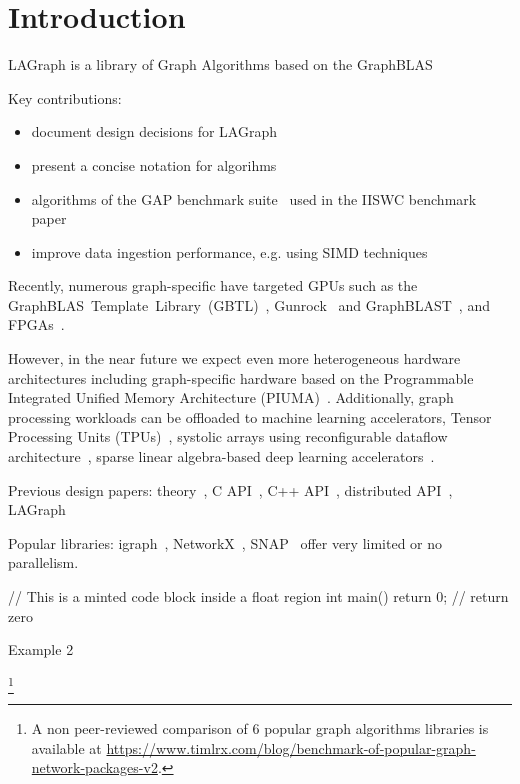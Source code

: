 \section{Introduction}
\label{sec:introduction}

LAGraph is a library of Graph Algorithms based on the GraphBLAS

Key contributions:

\begin{itemize}
    \item document design decisions for LAGraph
    \item present a concise notation for \grb algorihms
    \item algorithms of the GAP benchmark suite~\cite{DBLP:journals/corr/BeamerAP15} used in the IISWC benchmark paper~\cite{DBLP:conf/iiswc/AzadABBCDDDDFGG20}
    \item improve data ingestion performance, e.g. using SIMD techniques~\cite{DBLP:journals/vldb/LangdaleL19}
\end{itemize}

Recently, numerous graph-specific have targeted GPUs such as the \mbox{GraphBLAS Template Library (GBTL)}~\cite{7529957}, Gunrock~\cite{DBLP:journals/topc/WangPDWYWOYLRO17} and \mbox{GraphBLAST}~\cite{DBLP:journals/corr/abs-1908-01407}, and FPGAs~\cite{DBLP:journals/corr/abs-1903-06697}.

However, in the near future we expect even more heterogeneous hardware architectures including graph-specific hardware based on the Programmable Integrated Unified Memory Architecture (PIUMA)~\cite{DBLP:journals/corr/abs-2010-06277}.
Additionally, graph processing workloads can be offloaded to  machine learning accelerators, \eg
Tensor Processing Units (TPUs)~\cite{DBLP:conf/isca/JouppiYPPABBBBB17},
systolic arrays using reconfigurable dataflow architecture~\cite{SambaNova},
sparse linear algebra-based deep learning accelerators~\cite{Cerebras}.

Previous \grb design papers:
theory~\cite{DBLP:conf/hpec/MattsonBBBDFFGGHKLLPPRSWY13},
C API~\cite{DBLP:conf/hpec/MattsonYMBM17},
C++ API~\cite{DBLP:conf/ipps/BrockBMMM20},
distributed API~\cite{DBLP:conf/ipps/BrockBMMMPSS20},
LAGraph~\cite{DBLP:conf/ipps/MattsonDKBMMY19}

Popular libraries: igraph~\cite{igraph}, NetworkX~\cite{DBLP:reference/snam/X18xv}, SNAP~\cite{DBLP:journals/tist/LeskovecS16} offer very limited or no parallelism.

\begin{listing}[h]
\begin{cplus}
// This is a minted code block inside a float region
int main() {
    return 0; // return zero
}
\end{cplus}
\caption{Example 2}
\end{listing}


\footnote{A non peer-reviewed comparison of 6 popular graph algorithms libraries is available at
\url{https://www.timlrx.com/blog/benchmark-of-popular-graph-network-packages-v2}.}
